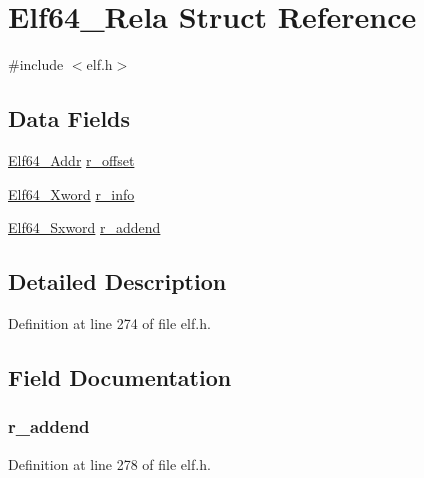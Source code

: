 \hypertarget{struct_elf64___rela}{\section{Elf64\-\_\-\-Rela Struct Reference}
\label{struct_elf64___rela}
}


{\ttfamily \#include $<$elf.\-h$>$}

\subsection*{Data Fields}
\begin{DoxyCompactItemize}
\item 
\hyperlink{elf_8h_aeed51d08e3a950d637f8ec1f0cd4ef65}{Elf64\-\_\-\-Addr} \hyperlink{struct_elf64___rela_a21afad4c85269dd5b12d5c836508cc36}{r\-\_\-offset}
\item 
\hyperlink{elf_8h_a5447a48a3dae0bd24f606415268c6fe4}{Elf64\-\_\-\-Xword} \hyperlink{struct_elf64___rela_a3876714743e1e751d96819f888a09158}{r\-\_\-info}
\item 
\hyperlink{elf_8h_a5b450442210b3d21567662fb96ac9a02}{Elf64\-\_\-\-Sxword} \hyperlink{struct_elf64___rela_aba5cd74f57ca7bcb22d003b8634fab8c}{r\-\_\-addend}
\end{DoxyCompactItemize}


\subsection{Detailed Description}


Definition at line 274 of file elf.\-h.



\subsection{Field Documentation}
\hypertarget{struct_elf64___rela_aba5cd74f57ca7bcb22d003b8634fab8c}{
\subsubsection[{r\-\_\-addend}]{ r\-\_\-addend}}\label{struct_elf64___rela_aba5cd74f57ca7bcb22d003b8634fab8c}


Definition at line 278 of file elf.\-h.

